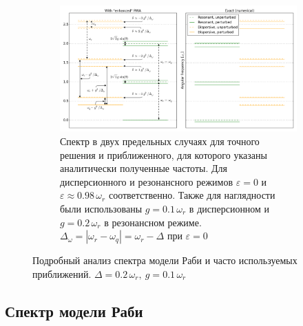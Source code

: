\documentclass[12pt, twoside]{report}
\numberwithin{equation}{section}
\numberwithin{figure}{section}
\begin{document}
\begin{figure}
\vspace{1cm}

\captionsetup[subfigure]{width=0.9\textwidth}
\begin{subfigure}[t]{\textwidth}
\centering
\includegraphics[width=.95\textwidth]{Pictures/JCM_levels}
\caption{Спектр в двух предельных случаях для точного решения и приближенного, для которого указаны аналитически полученные частоты. Для дисперсионного и резонансного режимов $\varepsilon = 0$ и $\varepsilon \approx 0.98\,\omega_r$ соответственно. Также для наглядности были использованы $g = 0.1\, \omega_r$ в дисперсионном и $g = 0.2\, \omega_r$ в резонансном режиме. $\Delta_\omega = |\omega_r - \omega_q| = \omega_r - \Delta$ при $\varepsilon = 0$}
\label{fig:rabi_analytic_spectrum}
\end{subfigure}
\caption{Подробный анализ спектра модели Раби и часто используемых приближений. $\Delta = 0.2\,\omega_r,\ g = 0.1\,\omega_r$}
\label{fig:rabi_spectrum}
\endgroup
\end{figure}

\subsection{Спектр модели Раби} \label{subsec:rabi_specrum}
\end{document}
